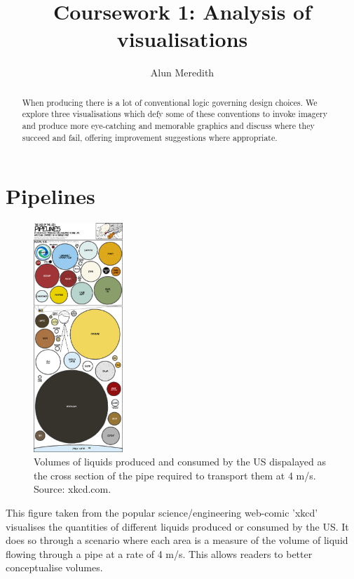 \documentclass[a4paper,10pt, twocolumn]{article}
\begin{document}
\title{Coursework 1: Analysis of visualisations}
\author{Alun Meredith}
\maketitle

\begin{abstract}
When producing there is a lot of conventional logic governing design choices. We explore three visualisations which defy some of these conventions to invoke imagery and produce more eye-catching and memorable graphics and discuss where they succeed and fail, offering improvement suggestions where appropriate. 
\end{abstract}
\section{Pipelines\cite{xkcd}}
\begin{figure}[!b]
	\includegraphics[width=0.3\textwidth]{xkcd.png}
	\centering
	\caption{Volumes of liquids produced and consumed by the US dispalayed as the cross section of the pipe required to transport them at 4 m/s. Source: xkcd.com\cite{xkcd}.}
	\label{fig:xkcd}
\end{figure} 

This figure taken from the popular science/engineering web-comic 'xkcd' visualises the quantities of different liquids produced or consumed by the US. It does so through a scenario where each area is a measure of the volume of liquid flowing through a pipe at a rate of 4 m/s. This allows readers to better conceptualise volumes. 
\end{document}
